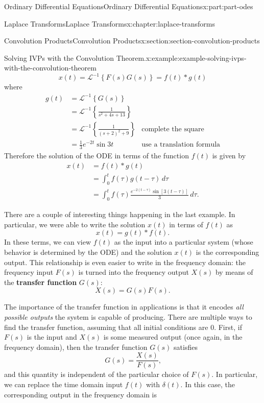 \documentclass[twoside,10pt,]{book}
\newcommand{\terminology}[1]{\textbf{#1}}
\numberwithin{equation}{part}
\newcommand{\Int}[2]{\int_{#1}^{#2}}
\newcommand{\iLaplace}[1]{\mathcal{L}^{-1}\left\{#1\right\}}
\newcommand{\amp}{&}
\begin{document}
\begin{partptx}{Ordinary Differential Equations}{}{Ordinary Differential Equations}{}{}{x:part:part-odes}
\begin{chapterptx}{Laplace Transforms}{}{Laplace Transforms}{}{}{x:chapter:laplace-transforms}
\begin{sectionptx}{Convolution Products}{}{Convolution Products}{}{}{x:section:section-convolution-products}
\begin{example}{Solving IVPs with the Convolution Theorem.}{x:example:example-solving-ivps-with-the-convolution-theorem}
\begin{equation*}
x(t) = \iLaplace{F(s)G(s)} = f(t)*g(t)
\end{equation*}
where%
\begin{align*}
g(t) \amp= \iLaplace{G(s)}\\
\amp= \iLaplace{\frac{1}{s^{2}+4s+13}} \\
\amp= \iLaplace{\frac{1}{(s+2)^{2}+9}} \amp \text{complete the square}\\
\amp= \frac{1}{3}e^{-2t}\sin3t \amp \text{use a translation formula}
\end{align*}
Therefore the solution of the ODE in terms of the function \(f(t)\) is given by%
\begin{align*}
x(t) \amp= f(t)\ast g(t)\\
\amp= \Int{0}{t}f(\tau)g(t-\tau)\,d\tau\\
\amp= \int_{0}^{t}f(\tau)\frac{e^{-2(t-\tau)}\sin[3(t-\tau)]}{3}\,d\tau\text{.}
\end{align*}
%
\end{example}
There are a couple of interesting things happening in the last example. In particular, we were able to write the solution \(x(t)\) in terms of \(f(t)\) as%
\begin{equation*}
x(t) = g(t)\ast f(t)\text{.}
\end{equation*}
In these terms, we can view \(f(t)\) as the input into a particular system (whose behavior is determined by the ODE) and the solution \(x(t)\) is the corresponding output. This relationship is even easier to write in the frequency domain: the frequency input \(F(s)\) is turned into the frequency output \(X(s)\) by means of the \terminology{transfer function} \(G(s)\):%
\begin{equation*}
X(s) = G(s)F(s)\text{.}
\end{equation*}
%
\par
The importance of the transfer function in applications is that it encodes \emph{all possible outputs} the system is capable of producing. There are multiple ways to find the transfer function, assuming that all initial conditions are \(0\). First, if \(F(s)\) is the input and \(X(s)\) is some measured output (once again, in the frequency domain), then the transfer function \(G(s)\) satisfies%
\begin{equation*}
G(s) = \frac{X(s)}{F(s)}\text{,}
\end{equation*}
and this quantity is independent of the particular choice of \(F(s)\). In particular, we can replace the time domain input \(f(t)\) with \(\delta(t)\). In this case, the corresponding output in the frequency domain is%

\end{sectionptx}
\end{chapterptx}
\end{partptx}
\end{document}
